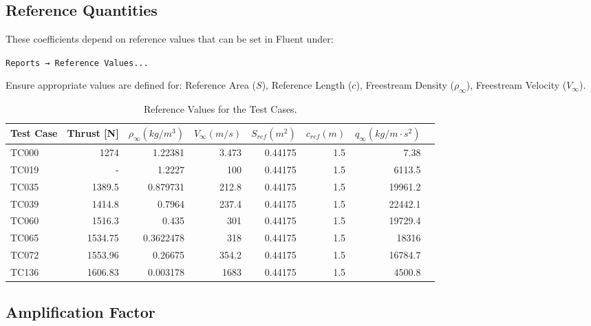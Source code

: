 \documentclass[12pt]{article}
\begin{document}
\subsection{Reference Quantities}
These coefficients depend on reference values that can be set in Fluent under:

\begin{center}
    \texttt{Reports → Reference Values...}
\end{center}

Ensure appropriate values are defined for: Reference Area ($S$), Reference Length ($c$), Freestream Density ($\rho_\infty$), Freestream Velocity ($V_\infty$).

\begin{table}[H]
\centering
\caption{Reference Values for the Test Cases.}
\label{tab:combined-reference-values}
\begin{tabular}{l|rrrrrrr}
\toprule
\textbf{Test Case} & Thrust [N] & $\rho_{\infty} (kg/m^3)$ & $V_{\infty} (m/s)$ & $S_{ref} (m^2)$ & $c_{ref} (m)$ & $q_{\infty} (kg/m \cdot s^2)$ \\
\midrule
TC000 & 1274    & 1.22381     & 3.473       & 0.44175 & 1.5 & 7.38 \\
TC019 & -       & 1.2227      & 100         & 0.44175 & 1.5 & 6113.5 \\
TC035 & 1389.5  & 0.879731    & 212.8       & 0.44175 & 1.5 & 19961.2 \\
TC039 & 1414.8  & 0.7964      & 237.4       & 0.44175 & 1.5 & 22442.1 \\
TC060 & 1516.3  & 0.435       & 301         & 0.44175 & 1.5 & 19729.4 \\
TC065 & 1534.75 & 0.3622478   & 318         & 0.44175 & 1.5 & 18316 \\
TC072 & 1553.96 & 0.26675     & 354.2       & 0.44175 & 1.5 & 16784.7 \\
TC136 & 1606.83 & 0.003178    & 1683        & 0.44175 & 1.5 & 4500.8 \\
\bottomrule
\end{tabular}
\end{table}

\subsection{Amplification Factor}\label{sec:amp_fac}
\end{document}
